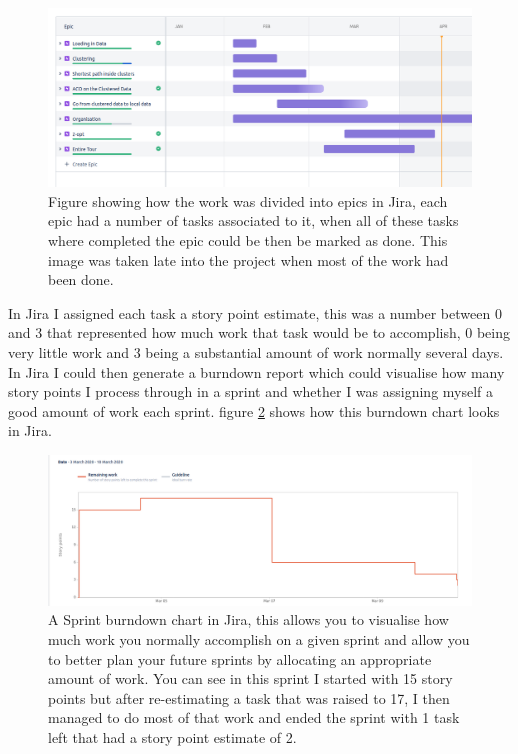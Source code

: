 \begin{figure}
    \centering
    \includegraphics[width=\textwidth]{figures/jira_epics.png}
    \caption{Figure showing how the work was divided into epics in Jira, each epic had a number of tasks associated to it, when all of these tasks where completed the epic could be then be marked as done. This image was taken late into the project when most of the work had been done.}
    \label{fig:jira_epics}
\end{figure}

In Jira I assigned each task a story point estimate, this was a number between 0 and 3 that represented how much work that task would be to accomplish, 0 being very little work and 3 being a substantial amount of work normally several days. In Jira I could then generate a burndown report which could visualise how many story points I process through in a sprint and whether I was assigning myself a good amount of work each sprint. figure \ref{fig:jira_burndown} shows how this burndown chart looks in Jira.

\begin{figure}[h]
    \centering
    \includegraphics[width=\textwidth]{figures/jira_sprint_burndown.png}
    \caption{A Sprint burndown chart in Jira, this allows you to visualise how much work you normally accomplish on a given sprint and allow you to better plan your future sprints by allocating an appropriate amount of work. You can see in this sprint I started with 15 story points but after re-estimating a task that was raised to 17, I then managed to do most of that work and ended the sprint with 1 task left that had a story point estimate of 2.}
    \label{fig:jira_burndown}
\end{figure}

